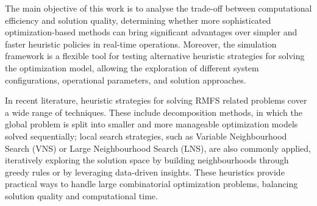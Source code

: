 \documentclass[11pt]{article}
\begin{document}
The main objective of this work is to analyse the trade-off between computational efficiency and solution quality, determining whether more sophisticated optimization-based methods can bring significant advantages over simpler and faster heuristic policies in real-time operations. Moreover, the simulation framework is a flexible tool for testing alternative heuristic strategies for solving the optimization model, allowing the exploration of different system configurations, operational parameters, and solution approaches. 

In recent literature, heuristic strategies for solving RMFS related problems cover a wide range of techniques. These include decomposition methods, in which the global problem is split into smaller and more manageable optimization models solved sequentially; local search strategies, such as Variable Neighbourhood Search (VNS) or Large Neighbourhood Search (LNS), are also commonly applied, iteratively exploring the solution space by building neighbourhoods through greedy rules or by leveraging data-driven insights.
These heuristics provide practical ways to handle large combinatorial optimization problems, balancing solution quality and computational time.
\end{document}
